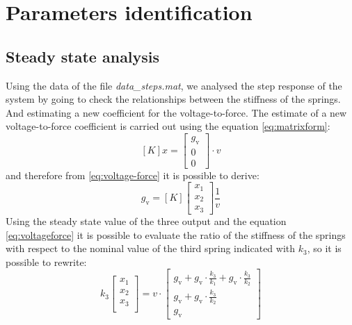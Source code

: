 \chapter{Parameters identification}
\label{chap:paramidentification}
\section{Steady state analysis}
\label{sec:steadystate}
Using the data of the file \emph{data\_steps.mat}, we analysed the step response
of the system by going to check the relationships between the stiffness of the 
springs. 
And estimating a new coefficient for the voltage-to-force.
The estimate of a new voltage-to-force coefficient is carried out using the 
equation \eqref{eq:matrixform}:
\begin{equation} 
\label{eq:voltage-force}
	[K] x = \begin{bmatrix}
 			g_{\text{v}}	\\
 			0 	\\
 			0
 		\end{bmatrix} \cdot v
\end{equation}
and therefore from \eqref{eq:voltage-force} it is possible to derive:
\begin{equation} \label{eq:voltageforce}
	g_{\text{v}} = [K] \begin{bmatrix}
	x_{1}\\
	x_{2}\\
	x_{3}
	\end{bmatrix}\frac{1}{v}
\end{equation}
Using the steady state value of the three output and the equation 
\eqref{eq:voltageforce} it is possible to evaluate the ratio of the stiffness 
of the springs with respect to  the nominal value of the third spring indicated 
with $k_3$, so it is possible to rewrite:
\begin{equation}
	\label{eq:gvestimate}
	k_3 \begin{bmatrix}
		x_1\\
		x_2\\
		x_3\\
	\end{bmatrix} = v \cdot
	\begin{bmatrix}
		g_{\text{v}} + g_{\text{v}} \cdot \frac{k_3}{k_1} + g_{\text{v}} \cdot 
		\frac{k_{3}}{k_{2}}\\
    		g_{\text{v}} + g_{\text{v}} \cdot \frac{k_{3}}{k_{2}}\\
    		g_{\text{v}}
    \end{bmatrix}
\end{equation}
